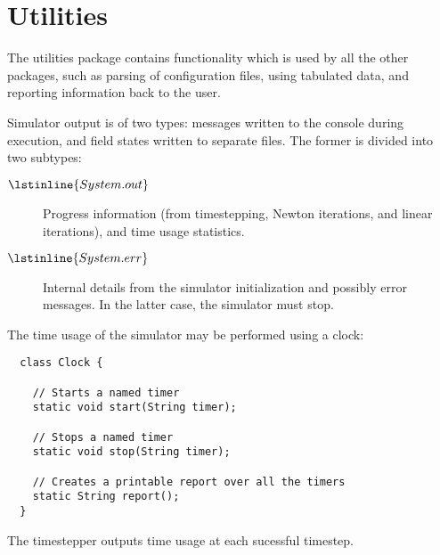 \chapter{Utilities}

\minitoc

The utilities package contains functionality which is used by all the
other packages, such as parsing of configuration files, using
tabulated data, and reporting information back to the user.







Simulator output is of two types: messages written to the console
during execution, and field states written to separate files. The
former is divided into two subtypes:
\begin{description}
\item[$\lstinline{System.out}$] Progress information (from
  timestepping, Newton iterations, and linear iterations), and time
  usage statistics.
\item[$\lstinline{System.err}$] Internal details from the simulator
  initialization and possibly error messages. In the latter case, the
  simulator must stop.
\end{description}



The time usage of the simulator may be performed using a clock:
\begin{lstlisting}
  class Clock {

    // Starts a named timer
    static void start(String timer);

    // Stops a named timer
    static void stop(String timer);

    // Creates a printable report over all the timers
    static String report();
  }
\end{lstlisting}

The timestepper outputs time usage at each sucessful timestep.

